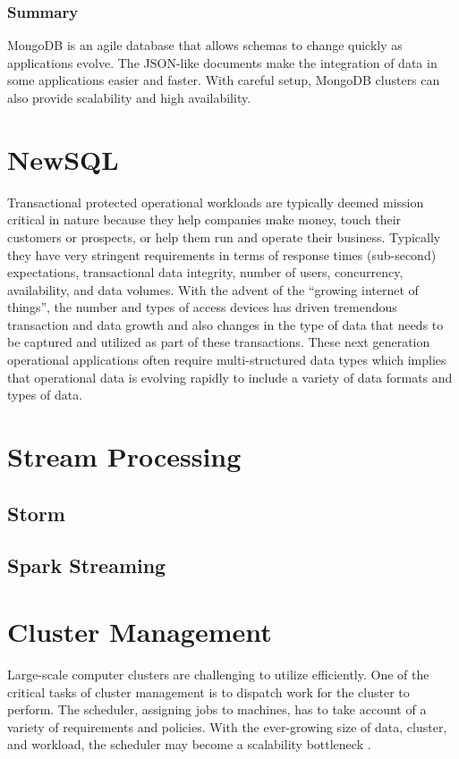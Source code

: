 \documentclass[12pt]{book}
\begin{document}
\subsection{Summary}
MongoDB is an agile database that allows schemas to change quickly as applications evolve. The JSON-like documents make the integration of data in some applications easier and faster. With careful setup, MongoDB clusters can also provide scalability and high availability.

\chapter[NewSQL]
{NewSQL}

Transactional protected operational workloads are typically deemed mission critical in nature because they help companies make money, touch their customers or prospects, or help them run and operate their business. Typically they have very stringent requirements in terms of response times (sub-second) expectations, transactional data integrity, number of users, concurrency, availability, and data volumes. With the advent of the ``growing internet of things'', the number and types of access devices has driven tremendous transaction and data growth and also changes in the type of data that needs to be captured and utilized as part of these transactions. These next generation operational applications often require multi-structured data types which implies that operational data is evolving rapidly to include a variety of data formats and types of data.

\chapter[Stream Processing]
{Stream Processing}

\section{Storm}

\section{Spark Streaming}


\chapter{Cluster Management}
Large-scale computer clusters are challenging to utilize efficiently. One of the critical tasks of cluster management is to dispatch work for the cluster to perform. The scheduler, assigning jobs to machines, has to take account of a variety of requirements and policies. With the ever-growing size of data, cluster, and workload, the scheduler may become a scalability bottleneck \cite{Schwarzkopf:2013:OFS}.
\end{document}
